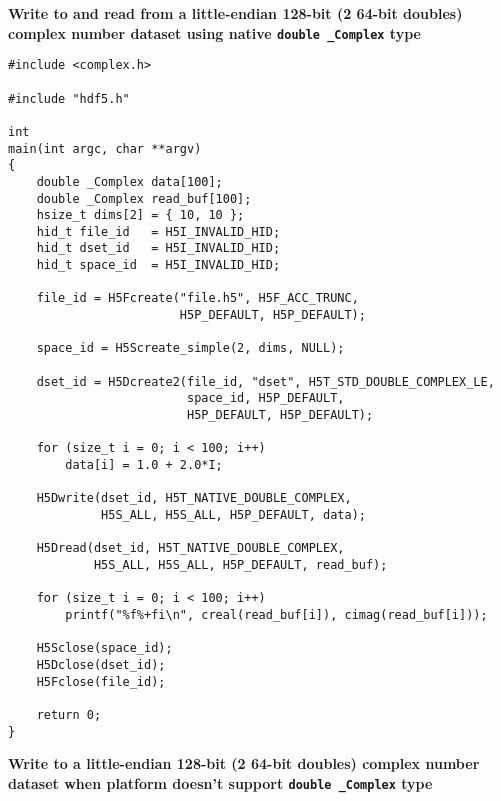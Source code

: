 \documentclass[../HDF5_RFC.tex]{subfiles}
\begin{document}
\newpage

\textbf{Write to and read from a little-endian 128-bit (2 64-bit doubles) complex number dataset using native \texttt{double \_Complex} type}

\begin{verbatim}
#include <complex.h>

#include "hdf5.h"

int
main(int argc, char **argv)
{
    double _Complex data[100];
    double _Complex read_buf[100];
    hsize_t dims[2] = { 10, 10 };
    hid_t file_id   = H5I_INVALID_HID;
    hid_t dset_id   = H5I_INVALID_HID;
    hid_t space_id  = H5I_INVALID_HID;

    file_id = H5Fcreate("file.h5", H5F_ACC_TRUNC,
                        H5P_DEFAULT, H5P_DEFAULT);

    space_id = H5Screate_simple(2, dims, NULL);

    dset_id = H5Dcreate2(file_id, "dset", H5T_STD_DOUBLE_COMPLEX_LE,
                         space_id, H5P_DEFAULT,
                         H5P_DEFAULT, H5P_DEFAULT);

    for (size_t i = 0; i < 100; i++)
        data[i] = 1.0 + 2.0*I;

    H5Dwrite(dset_id, H5T_NATIVE_DOUBLE_COMPLEX,
             H5S_ALL, H5S_ALL, H5P_DEFAULT, data);

    H5Dread(dset_id, H5T_NATIVE_DOUBLE_COMPLEX,
            H5S_ALL, H5S_ALL, H5P_DEFAULT, read_buf);

    for (size_t i = 0; i < 100; i++)
        printf("%f%+fi\n", creal(read_buf[i]), cimag(read_buf[i]));

    H5Sclose(space_id);
    H5Dclose(dset_id);
    H5Fclose(file_id);

    return 0;
}
\end{verbatim}

\newpage

\textbf{Write to a little-endian 128-bit (2 64-bit doubles) complex number dataset when platform doesn't support \texttt{double \_Complex} type}
\end{document}
